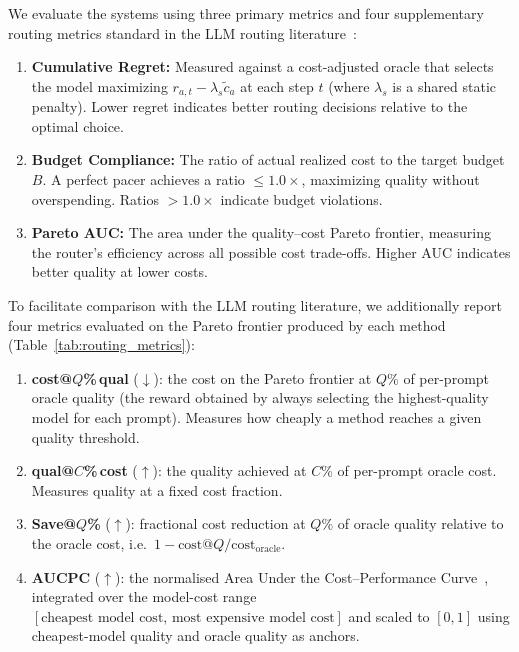 We evaluate the systems using three primary metrics and four supplementary routing metrics standard in the LLM routing literature~\cite{ong2024routellm,ding2024hybrid}:
\begin{enumerate}[nosep,leftmargin=*]
  \item \textbf{Cumulative Regret:} Measured against a cost-adjusted oracle that selects the model maximizing $r_{a,t} - \lambda_s \tilde{c}_a$ at each step $t$ (where $\lambda_s$ is a shared static penalty). Lower regret indicates better routing decisions relative to the optimal choice.
  \item \textbf{Budget Compliance:} The ratio of actual realized cost to the target budget $B$. A perfect pacer achieves a ratio $\leq 1.0\times$, maximizing quality without overspending. Ratios $>1.0\times$ indicate budget violations.
  \item \textbf{Pareto AUC:} The area under the quality--cost Pareto frontier, measuring the router's efficiency across all possible cost trade-offs. Higher AUC indicates better quality at lower costs.
\end{enumerate}

\noindent
To facilitate comparison with the LLM routing literature, we additionally report four metrics evaluated on the Pareto frontier produced by each method (Table~\ref{tab:routing_metrics}):
\begin{enumerate}[nosep,leftmargin=*]
  \item \textbf{cost@$Q$\%\,qual} ($\downarrow$): the cost on the Pareto frontier at $Q$\% of per-prompt oracle quality (the reward obtained by always selecting the highest-quality model for each prompt).  Measures how cheaply a method reaches a given quality threshold.
  \item \textbf{qual@$C$\%\,cost} ($\uparrow$): the quality achieved at $C$\% of per-prompt oracle cost.  Measures quality at a fixed cost fraction.
  \item \textbf{Save@$Q$\%} ($\uparrow$): fractional cost reduction at $Q$\% of oracle quality relative to the oracle cost, i.e.\ $1 - \text{cost@}Q / \text{cost}_{\text{oracle}}$.
  \item \textbf{AUCPC} ($\uparrow$): the normalised Area Under the Cost--Performance Curve~\cite{ding2024hybrid}, integrated over the model-cost range $[\text{cheapest model cost},\, \text{most expensive model cost}]$ and scaled to $[0,1]$ using cheapest-model quality and oracle quality as anchors.
\end{enumerate}